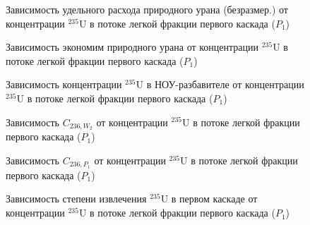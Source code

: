 {\begin{figure}[ht]
    \centering
    \begin{minipage}{.5\textwidth}
        \centering
        
  \caption{{Зависимость удельного расхода природного урана (безразмер.) от концентрации $^{235}$U в потоке легкой фракции первого каскада ($P_1$){\label{FnuP1}}}}
  \end{minipage}%
    \begin{minipage}{.5\textwidth}
      \centering
      
\caption{{Зависимость экономим природного урана от концентрации $^{235}$U в потоке легкой фракции первого каскада ($P_1$){\label{pFoP1}}}}
    \end{minipage}
\end{figure}


\begin{figure}[ht]
    \centering
    \begin{minipage}{.5\textwidth}
      \centering
      
\caption{{Зависимость концентрации $^{235}$U в НОУ-разбавителе от концентрации $^{235}$U в потоке легкой фракции первого каскада ($P_1$){\label{C235P0}}}}
\end{minipage}
\end{figure}

\begin{figure}[ht]
    \centering
    \begin{minipage}{.5\textwidth}
      \centering
      
      \caption{{Зависимость $C_{236,W_2}$ от концентрации $^{235}$U в потоке легкой фракции первого каскада ($P_1$){\label{C236W2}}}}
    \end{minipage}%
    \begin{minipage}{.5\textwidth}
      \centering
      
      \caption{{Зависимость $C_{236,P_1}$ от концентрации $^{235}$U в потоке легкой фракции первого каскада ($P_1$){\label{C236P1}}}}
  \end{minipage}
  \end{figure}

\begin{figure}[ht]
    \centering
      
    \caption{Зависимость степени извлечения $^{235}$U в первом каскаде от концентрации $^{235}$U в потоке легкой фракции первого каскада ($P_1$)}\label{ex1P1}
\end{figure}

}
